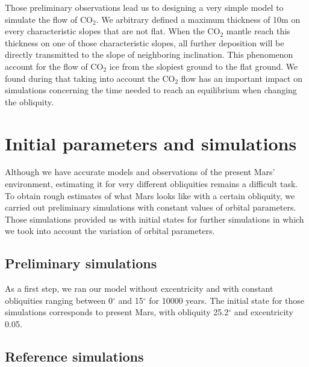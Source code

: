 Those preliminary observations lead us to designing a very simple model to simulate the flow of CO$_2$. 
We arbitrary defined a maximum thickness of 10m on every characteristic slopes that are not flat. When
the CO$_2$ mantle reach this thickness on one of those characteristic slopes, all further deposition 
will be directly transmitted to the slope of neighboring inclination. This phenomenon account for the
flow of CO$_2$ ice from the slopiest ground to the flat ground. We found during that taking
into account the CO$_2$ flow has an important impact on simulations concerning the time needed 
to reach an equilibrium when changing the obliquity.




\section{Initial parameters and simulations}
\label{sc:init}


Although we have accurate models and observations of the present Mars' environment, estimating it
for very different obliquities remains a difficult task. To obtain rough estimates of what Mars looks
like with a certain obliquity, we carried out preliminary simulations with constant values of orbital
parameters. Those simulations provided us with initial states for further simulations in which we
took into account the variation of orbital parameters.

\subsection{Preliminary simulations}
\label{sc:preli_simu}

As a first step, we ran our model without excentricity and with constant obliquities ranging between 
0$^{\circ}$ and 15$^{\circ}$ for 10000 years. The initial state for those simulations corresponds
to present Mars, with obliquity 25.2$^{\circ}$ and excentricity 0.05. 


\subsection{Reference simulations}
\label{sc:ref_simu}
